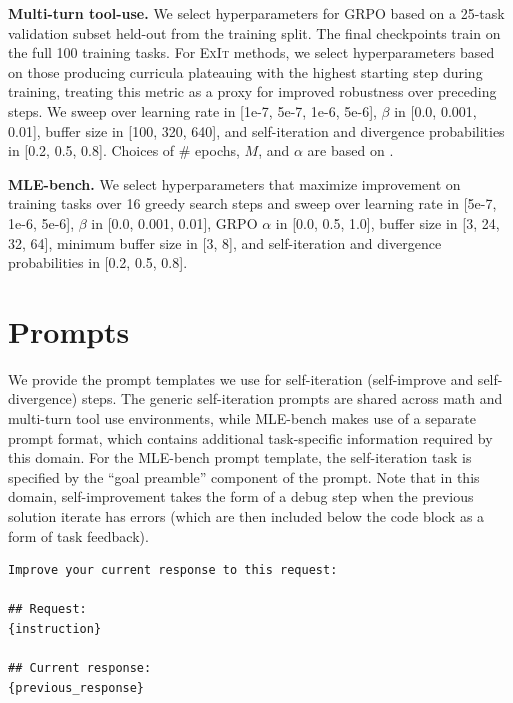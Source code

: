\documentclass[10pt]{article} %
\newcommand{\methodname}{\textsc{ExIt}}
\begin{document}


\textbf{Multi-turn tool-use.} We select hyperparameters for GRPO based on a 25-task validation subset held-out from the training split. The final checkpoints train on the full 100 training tasks. For \methodname{} methods, we select hyperparameters based on those producing curricula plateauing with the highest starting step during training, treating this metric as a proxy for improved robustness over preceding steps. We sweep over learning rate in [1e-7, 5e-7, 1e-6, 5e-6], $\beta$ in [0.0, 0.001, 0.01], buffer size in [100, 320, 640], and self-iteration and divergence probabilities in [0.2, 0.5, 0.8]. Choices of \# epochs, $M$, and $\alpha$ are based on \citet{bespoke_improving_multi_turn_tool_use}.



\textbf{MLE-bench.} We select hyperparameters that maximize improvement on training tasks over 16 greedy search steps and sweep over learning rate in [5e-7, 1e-6, 5e-6], $\beta$ in [0.0, 0.001, 0.01], GRPO $\alpha$ in [0.0, 0.5, 1.0], buffer size in [3, 24, 32, 64], minimum buffer size in [3, 8], and self-iteration and divergence probabilities in [0.2, 0.5, 0.8].



\clearpage
\newpage

\section{Prompts}
\label{app:prompts}

We provide the prompt templates we use for self-iteration (self-improve and self-divergence) steps. The generic self-iteration prompts are shared across math and multi-turn tool use environments, while MLE-bench makes use of a separate prompt format, which contains additional task-specific information required by this domain. For the MLE-bench prompt template, the  self-iteration task is specified by the ``goal preamble'' component of the prompt. Note that in this domain, self-improvement takes the form of a debug step when the previous solution iterate has errors (which are then included below the code block as a form of task feedback).

\begin{promptbox}[title=Self-improve prompt, colbacktitle=orange!90!black, colframe=orange!90!black,
colback=gray!5]
\small
\begin{verbatim}
Improve your current response to this request:

## Request:
{instruction}

## Current response:
{previous_response}
\end{verbatim}
\end{promptbox}
\end{document}
